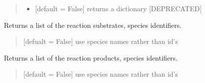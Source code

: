 \documentclass[letterpaper,12pt,english]{sphinxmanual}
\begin{document}
\begin{fulllineitems}
\begin{fulllineitems}
\begin{quote}
\begin{description}
\begin{itemize}
\item {} 
\sphinxAtStartPar
{} \textendash{} {[}default = False{]} returns a dictionary {[}DEPRECATED{]}

\end{itemize}

\end{description}\end{quote}

\end{fulllineitems}


\begin{fulllineitems}
\label{\detokenize{api/core:cbmpy.CBModel.Reaction.getSubstrateIds}}
\pysigstartsignatures
\pysiglinewithargsret
{}
{}
{}
\pysigstopsignatures
\sphinxAtStartPar
Returns a list of the reaction substrates, species identifiers.
\begin{quote}\begin{description}
\sphinxAtStartPar
{} \textendash{} {[}defualt = False{]} use species names rather than id’s

\end{description}\end{quote}

\end{fulllineitems}


\begin{fulllineitems}
\label{\detokenize{api/core:cbmpy.CBModel.Reaction.getProductIds}}
\pysigstartsignatures
\pysiglinewithargsret
{}
{}
{}
\pysigstopsignatures
\sphinxAtStartPar
Returns a list of the reaction products, species identifiers.
\begin{quote}\begin{description}
\sphinxAtStartPar
{} \textendash{} {[}default = False{]} use species names rather than id’s


\end{description}
\end{quote}
\end{fulllineitems}
\end{fulllineitems}
\end{document}
